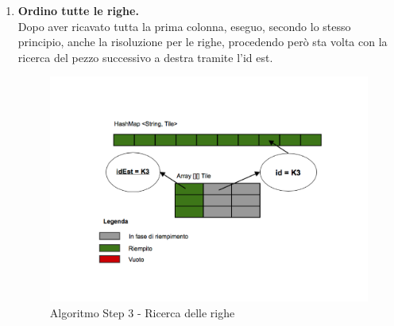 \begin{enumerate}
		\item \textbf{Ordino tutte le righe.} \\
Dopo aver ricavato tutta la prima colonna, eseguo, secondo lo stesso principio, anche la risoluzione per le righe, procedendo però sta volta con la ricerca del pezzo successivo a destra tramite l'id est.
		\begin{figure}[htbp]
			\centering
			\includegraphics[width=15cm]{img/algpuzzle_step3.pdf}
			\caption{Algoritmo Step 3 - Ricerca delle righe}
			\label{Algoritmo Step 3 - Ricerca delle righe}
		\end{figure}

	\end{enumerate}


